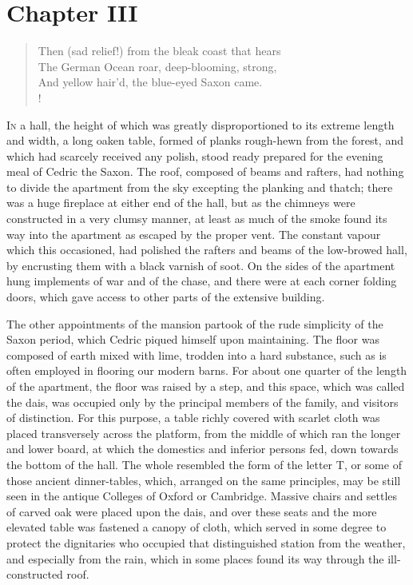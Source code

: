 \chapter{Chapter III}

\begin{verse}
Then (sad relief!) from the bleak coast that hears\\
The German Ocean roar, deep-blooming, strong,\\
And yellow hair'd, the blue-eyed Saxon came.\\!
\end{verse}

\lettrine{I}{n} a hall, the height of which was greatly disproportioned
to its
extreme length and width, a long oaken table, formed of planks
rough-hewn from the forest, and which had scarcely received any polish,
stood ready prepared for the evening meal of Cedric the Saxon. The roof,
composed of beams and rafters, had nothing to divide the apartment from
the sky excepting the planking and thatch; there was a huge fireplace at
either end of the hall, but as the chimneys were constructed in a very
clumsy manner, at least as much of the smoke found its way into the
apartment as escaped by the proper vent. The constant vapour which this
occasioned, had polished the rafters and beams of the low-browed hall,
by encrusting them with a black varnish of soot. On the sides of the
apartment hung implements of war and of the chase, and there were at
each corner folding doors, which gave access to other parts of the
extensive building.

The other appointments of the mansion partook of the rude simplicity of
the Saxon period, which Cedric piqued himself upon maintaining. The
floor was composed of earth mixed with lime, trodden into a hard
substance, such as is often employed in flooring our modern barns. For
about one quarter of the length of the apartment, the floor was raised
by a step, and this space, which was called the dais, was occupied only
by the principal members of the family, and visitors of distinction. For
this purpose, a table richly covered with scarlet cloth was placed
transversely across the platform, from the middle of which ran the
longer and lower board, at which the domestics and inferior persons fed,
down towards the bottom of the hall. The whole resembled the form of the
letter T, or some of those ancient dinner-tables, which, arranged on the
same principles, may be still seen in the antique Colleges of Oxford or
Cambridge. Massive chairs and settles of carved oak were placed upon the
dais, and over these seats and the more elevated table was fastened a
canopy of cloth, which served in some degree to protect the dignitaries
who occupied that distinguished station from the weather, and especially
from the rain, which in some places found its way through the
ill-constructed roof.

